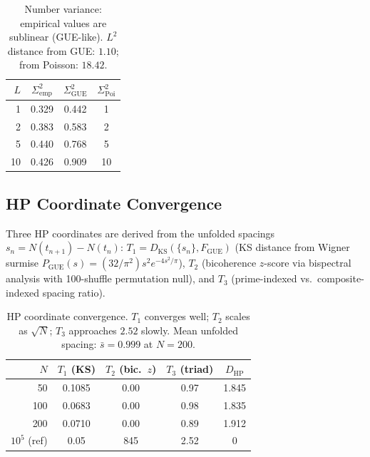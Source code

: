 \documentclass[11pt,a4paper]{article}
\theoremstyle{plain}
\theoremstyle{remark}
\begin{document}
\begin{table}[H]
\centering
\begin{tabular}{rccc}
\toprule
$L$ & $\Sigma^2_{\mathrm{emp}}$ & $\Sigma^2_{\mathrm{GUE}}$ & $\Sigma^2_{\mathrm{Poi}}$ \\
\midrule
 1 & 0.329 & 0.442 &  1 \\
 2 & 0.383 & 0.583 &  2 \\
 5 & 0.440 & 0.768 &  5 \\
10 & 0.426 & 0.909 & 10 \\
\bottomrule
\end{tabular}
\caption{Number variance: empirical values are sublinear (GUE-like).
  $L^2$ distance from GUE: $1.10$; from Poisson: $18.42$.}
\label{tab:number-var}
\end{table}

\subsection{HP Coordinate Convergence}
\label{sec:hp-convergence}

Three HP coordinates are derived from the unfolded spacings
$s_n = N(t_{n+1}) - N(t_n)$:
$T_1 = D_{\mathrm{KS}}(\{s_n\}, F_{\mathrm{GUE}})$ (KS distance
from Wigner surmise $P_{\mathrm{GUE}}(s) = (32/\pi^2)s^2 e^{-4s^2/\pi}$),
$T_2$ (bicoherence $z$-score via bispectral analysis with 100-shuffle
permutation null), and $T_3$ (prime-indexed vs.\ composite-indexed
spacing ratio).

\begin{table}[H]
\centering
\begin{tabular}{@{}rcccc@{}}
\toprule
$N$ & $T_1$ (KS) & $T_2$ (bic.\ $z$) & $T_3$ (triad) & $D_{\mathrm{HP}}$\\
\midrule
 50  & 0.1085 & 0.00 & 0.97 & 1.845\\
100  & 0.0683 & 0.00 & 0.98 & 1.835\\
200  & 0.0710 & 0.00 & 0.89 & 1.912\\
\midrule
$10^5$ (ref) & 0.05 & 845 & 2.52 & 0\\
\bottomrule
\end{tabular}
\caption{HP coordinate convergence.
  $T_1$ converges well; $T_2$ scales as $\sqrt{N}$; $T_3$ approaches
  $2.52$ slowly.  Mean unfolded spacing: $\bar{s}=0.999$ at $N=200$.}
\label{tab:hp-convergence}
\end{table}

\end{document}

